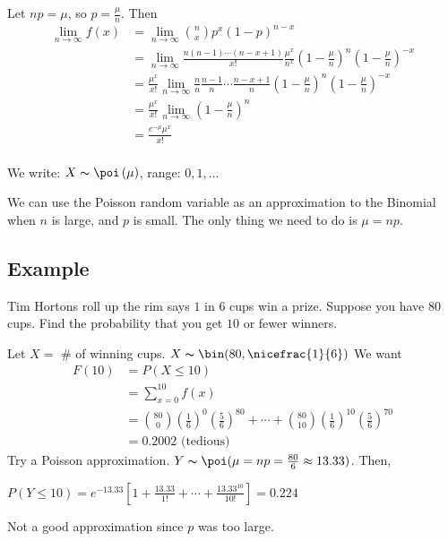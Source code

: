 Let $ np=\mu $, so $ p=\frac{\mu}{n} $. Then
\begin{align*}
    \lim\limits_{{n} \to {\infty}} f\left(x\right)
    &=\lim\limits_{{n} \to {\infty}} \binom{n}{x}p^x\left(1-p\right)^{n-x}\\
    &=\lim\limits_{{n} \to {\infty}} \frac{n\left(n-1\right)\cdots\left(n-x+1\right)}{x!}
    \frac{\mu^x}{n^x} \left(1-\frac{\mu}{n}\right)^n\left(1-\frac{\mu}{n}\right)^{-x}\\
    &=\frac{\mu^x}{x!} \lim\limits_{{n} \to {\infty}} \frac{n}{n}
    \frac{n-1}{n} \cdots \frac{n-x+1}{n}\left(1-\frac{\mu}{n}\right)^n\left(1-\frac{\mu}{n}\right)^{-x}\\
    &=\frac{\mu^x}{x!} \lim\limits_{{n} \to {\infty}} \left(1-\frac{\mu}{n}\right)^n\\
    &=\frac{e^{-\mu}\mu^x}{x!}\\
\end{align*}

We write: $ X \thicksim \poi\left(\mu\right) $, range: $ 0,1,\ldots $

We can use the Poisson random variable as an approximation to the Binomial
when $ n $ is large, and $ p $ is small. The only thing we need to do
is $ \mu=np $.

\subsection{Example}
Tim Hortons roll up the rim says $ 1 $ in $ 6 $ cups win a prize. Suppose
you have $ 80 $ cups. Find the probability that you get $ 10 $ or fewer
winners.

Let $ X= $ \# of winning cups. $ X \thicksim \bin(80,\nicefrac{1}{6}) $
We want
\begin{align*}
    F(10)&=P(X\le 10)\\
    &=\sum\limits_{x=0}^{10} f(x)\\
    &=\binom{80}{0}\left(\frac{1}{6}\right)^0\left(\frac{5}{6}\right)^{80}+\cdots+
    \binom{80}{10}\left(\frac{1}{6}\right)^{10}\left(\frac{5}{6}\right)^{70}\\
    &=0.2002 \text{ (tedious) }
\end{align*}
Try a Poisson approximation.
$ Y \thicksim \poi(\mu=np=\frac{80}{6}\approx 13.33) $. Then, 

$ P(Y\le 10)=e^{-13.33}\left[1+\frac{13.33}{1!}+\cdots+\frac{13.33^{10}}{10!}\right]=0.224 $

Not a good approximation since $ p $ was too large.

